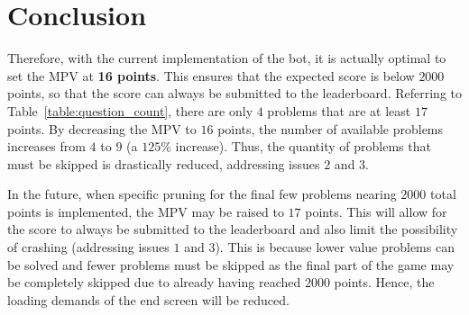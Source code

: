 \documentclass{article}
\begin{document}
\section{Conclusion}
Therefore, with the current implementation of the bot, it is actually optimal to set the MPV at \textbf{16 points}. This ensures that the expected score is below $2000$ points, so that the score can always be submitted to the leaderboard. Referring to Table~\ref{table:question_count}, there are only $4$ problems that are at least $17$ points. By decreasing the MPV to $16$ points, the number of available problems increases from $4$ to $9$ (a $125\%$ increase). Thus, the quantity of problems that must be skipped is drastically reduced, addressing issues $2$ and $3$.

In the future, when specific pruning for the final few problems nearing $2000$ total points is implemented, the MPV may be raised to $17$ points. This will allow for the score to always be submitted to the leaderboard and also limit the possibility of crashing (addressing issues $1$ and $3$). This is because lower value problems can be solved and fewer problems must be skipped as the final part of the game may be completely skipped due to already having reached $2000$ points. Hence, the loading demands of the end screen will be reduced.

\newpage
\printbibliography
\end{document}
